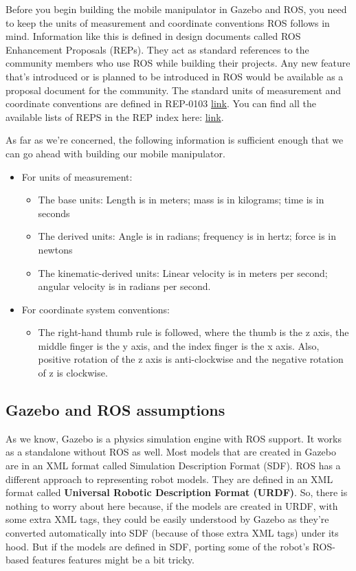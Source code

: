 \documentclass[letterpaper,pdftex]{article}
\begin{document}
Before you begin building the mobile manipulator in Gazebo and ROS, you need to keep the units of measurement and coordinate conventions ROS follows in mind. Information
like this is defined in design documents called ROS Enhancement Proposals (REPs). They act as standard references to the community members who use ROS while building their projects. Any new feature that's introduced or is planned to be introduced in ROS would be available as a proposal document for the community. The standard units of measurement and coordinate conventions are defined in REP-0103 \href{http://www.ros.org/reps/rep-0103.html}{link}. You can find all the available lists of REPS in the REP index here: \href{http://www.ros.org/reps/rep-0000.html}{link}.

As far as we're concerned, the following information is sufficient enough that we can go ahead with building our mobile manipulator.
\begin{itemize}
\item For units of measurement:
\begin{itemize}
\item The base units: Length is in meters; mass is in kilograms; time is in seconds 
\item The derived units: Angle is in radians; frequency is in hertz; force is in newtons
\item The kinematic-derived units: Linear velocity is in meters per second; angular velocity is in radians per second.
\end{itemize}

\item For coordinate system conventions:
\begin{itemize}
\item The right-hand thumb rule is followed, where the thumb is the z axis, the middle finger is the y axis, and the index finger is the x axis. Also, positive rotation of the z axis is anti-clockwise and the negative rotation of z is clockwise.
\end{itemize}

\end{itemize}

\subsection{Gazebo and ROS assumptions}

As we know, Gazebo is a physics simulation engine with ROS support. It works as a standalone without ROS as well. Most models that are created in Gazebo are in an XML format called Simulation Description Format (SDF). ROS has a different approach to representing robot models. They are defined in an XML format called \textbf{Universal Robotic Description Format (URDF)}. So, there is nothing to worry about here because, if the models are created in URDF, with some extra XML tags, they could be easily understood by Gazebo as they're converted automatically into SDF (because of those extra XML tags) under its hood. But if the models are defined in SDF, porting some of the robot's ROS-based features features might be a bit tricky.
\end{document}
